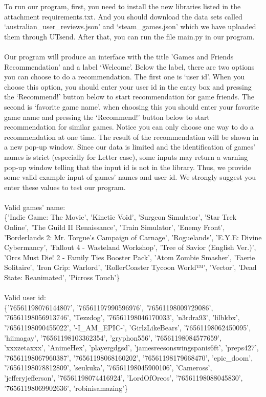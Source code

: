 \documentclass[fontsize=11pt]{article}
\begin{document}
    To run our program, first, you need to install the new libraries listed in the attachment requirements.txt. And you should download the data sets called ‘australian\_user\_reviews.json’ and ‘steam\_games.json’ which we have uploaded them through UTsend. After that, you can run the file main.py in our program.
    \\
    \\Our program will produce an interface with the title 'Games and Friends Recommendation' and a label ‘Welcome’. Below the label, there are two options you can choose to do a recommendation. The first one is ‘user id’. When you choose this option, you should enter your user id in the entry box and pressing the ‘Recommend!’ button below to start recommendation for game friends. The second is ‘favorite game name’. when choosing this you should enter your favorite game name and pressing the ‘Recommend!’ button below to start recommendation for similar games. Notice you can only choose one way to do a recommendation at one time. The result of the recommendation will be shown in a new pop-up window. Since our data is limited and the identification of games’ names is strict (especially for Letter case), some inputs may return a warning pop-up window telling that the input id is not in the library. Thus, we provide some valid example input of games’ names and user id. We strongly suggest you enter these values to test our program.
    \\
    \\Valid games’ name: 
    \\ \{'Indie Game: The Movie', 'Kinetic Void', 'Surgeon Simulator', 'Star Trek Online', 'The Guild II Renaissance', 'Train Simulator', 'Enemy Front', 'Borderlands 2: Mr. Torgue’s Campaign of Carnage', 'Roguelands', 'E.Y.E: Divine Cybermancy', 'Fallout 4 - Wasteland Workshop', 'Tree of Savior (English Ver.)', 'Orcs Must Die! 2 - Family Ties Booster Pack', 'Atom Zombie Smasher', 'Faerie Solitaire', 'Iron Grip: Warlord', 'RollerCoaster Tycoon World™', 'Vector', 'Dead State: Reanimated', 'Picross Touch'\}
    \\
    \\Valid user id:
    \\ \{'76561198076144807', '76561197990596976', '76561198009729086', '76561198056913746', 'Tezzdog', '76561198046170033', 'n3rdra93', 'lilbkbx', '76561198090455022', '-I\_AM\_EPIC-', 'GirlzLikeBears', '76561198062450095', 'hiimagay', '76561198103362354', 'gryphon556', '76561198084577659', 'xxxzetaxxx', 'AnimeHex', 'playergdgsd', 'jamesreesonswingspanis6ft', 'preps427', '76561198067960387', '76561198068160202', '76561198179668470', 'epic\_doom', '76561198078812809', 'seukuka', '76561198045900106', 'Cameross', 'jefferyjefferson', '76561198074416924', 'LordOfOreos', '76561198088045830', '76561198069902636', 'robinisamazing'\}
\end{document}
